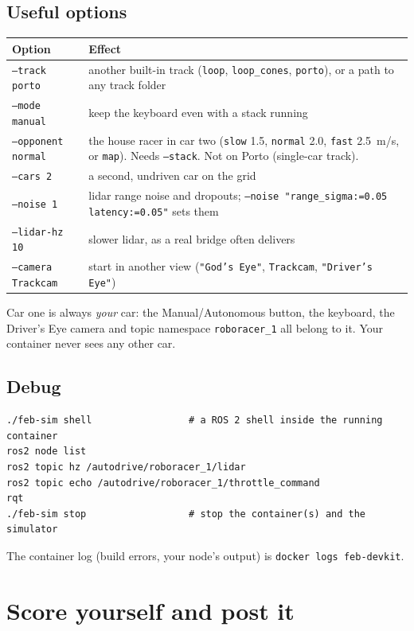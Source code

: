 \documentclass[11pt,a4paper]{article}
\newcommand{\cmd}[1]{\texttt{#1}}
\begin{document}
\subsection{Useful options}

\begin{tabularx}{\linewidth}{lX}
\toprule
Option & Effect\\
\midrule
\texttt{--track porto} & another built-in track (\texttt{loop}, \texttt{loop\_cones}, \texttt{porto}), or a path to any track folder\\
\texttt{--mode manual} & keep the keyboard even with a stack running\\
\texttt{--opponent normal} & the house racer in car two (\texttt{slow} 1.5, \texttt{normal} 2.0, \texttt{fast} 2.5~m/s, or \texttt{map}). Needs \texttt{--stack}. Not on Porto (single-car track).\\
\texttt{--cars 2} & a second, undriven car on the grid\\
\texttt{--noise 1} & lidar range noise and dropouts; \texttt{--noise "range\_sigma:=0.05 latency:=0.05"} sets them\\
\texttt{--lidar-hz 10} & slower lidar, as a real bridge often delivers\\
\texttt{--camera Trackcam} & start in another view (\texttt{"God's Eye"}, \texttt{Trackcam}, \texttt{"Driver's Eye"})\\
\bottomrule
\end{tabularx}

Car one is always \emph{your} car: the Manual/Autonomous button, the keyboard, the Driver's
Eye camera and topic namespace \texttt{roboracer\_1} all belong to it. Your container never sees
any other car.

\subsection{Debug}

\begin{lstlisting}
./feb-sim shell                 # a ROS 2 shell inside the running container
ros2 node list
ros2 topic hz /autodrive/roboracer_1/lidar
ros2 topic echo /autodrive/roboracer_1/throttle_command
rqt
./feb-sim stop                  # stop the container(s) and the simulator
\end{lstlisting}

The container log (build errors, your node's output) is \cmd{docker logs feb-devkit}.

\section{Score yourself and post it}
\end{document}
